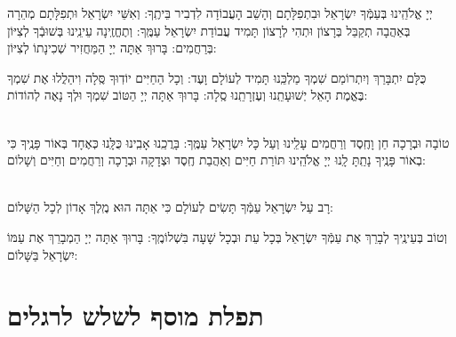 \documentclass[twoside, openany, parskip=half, 11pt]{book}
\begin{document}
 יְיָ אֱלֹהֵֽינוּ בְּעַמְּֿךָ יִשְׂרָאֵל וּבִתְפִלָּתָם וְהָשֵׁב הָעֲבוֹדָה לִדְבִיר בֵּיתֶֽךָ: וְאִשֵּׁי יִשְׂרָאֵל וּתְפִלָּתָם מְהֵרָה בְּאַהֲבָה תְקַבֵּל בְּרָצוֹן וּתְהִי לְרָצוֹן תָּמִיד עֲבוֹדַת יִשְׂרָאֵל עַמֶּֽךָ: וְתֶחֱזֶֽינָה עֵינֵֽינוּ בְּשׁוּבְֿךָ לְצִיּוֹן בְּרַחֲמִים: בָּרוּךְ אַתָּה יְיָ הַמַּחֲזִיר שְׁכִינָתוֹ לְצִיּוֹן:

\modim

 כֻּלָּם יִתְבָּרַךְ וְיִתְרוֹמַם שִׁמְךָ מַלְכֵּֽנוּ תָּמִיד לְעוֹלָם וָעֶד: וְכָל הַחַיִּים יוֹדֽוּךָ סֶּֽלָה וִיהַלֲלוּ אֶת שִׁמְךָ בֶּאֱמֶת הָאֵל יְשׁוּעָתֵֽנוּ וְעֶזְרָתֵֽנוּ סֶֽלָה: בָּרוּךְ אַתָּה יְיָ הַטּוֹב שִׁמְךָ וּלְךָ נָאֶה לְהוֹדוֹת:

\enlargethispage{\baselineskip}

\bircaskohanim




\begin{paracol}{2}

\begin{small}
\\
 טוֹבָה וּבְרָכָה חֵן וָחֶֽסֶד וְרַחֲמִים עָלֵֽינוּ וְעַל כָּל יִשְׂרָאֵל עַמֶּֽךָ: בָּרֲכֵֽנוּ אָבִֽינוּ כֻּלָּֽנוּ כְּאֶחָד בְּאוֹר פָּנֶֽיךָ כִּי בְאוֹר פָּנֶֽיךָ נָתַֽתָּ לָֽנוּ יְיָ אֱלֹהֵֽינוּ תּוֹרַת חַיִּים וְאַהֲבַת חֶֽסֶד וּצְדָקָה וּבְרָכָה וְרַחֲמִים וְחַיִּים וְשָׁלוֹם:

\end{small}

\switchcolumn

\\
 רָב עַל יִשְׂרָאֵל עַמְּֿךָ תָּשִׂים לְעוֹלָם כִּי אַתָּה הוּא מֶֽלֶךְ אָדוֹן לְכָל הַשָּׁלוֹם:
\end{paracol}
 וְטוֹב בְּעֵינֶֽיךָ לְבָרֵךְ אֶת עַמְּֿךָ יִשְׂרָאֵל בְּכָל עֵת וּבְכָל שָׁעָה בִּשְׁלוֹמֶֽךָ: בָּרוּךְ אַתָּה יְיָ הַמְבָרֵךְ אֶת עַמּוֹ יִשְׂרָאֵל בַּשָּׁלוֹם:

\tachanunim


\vfill



\sepline

\chapter[תפלת מוסף לשלש לרגלים]{ תפלת מוסף לשלש לרגלים }
\label{musaphregel}
\end{document}
